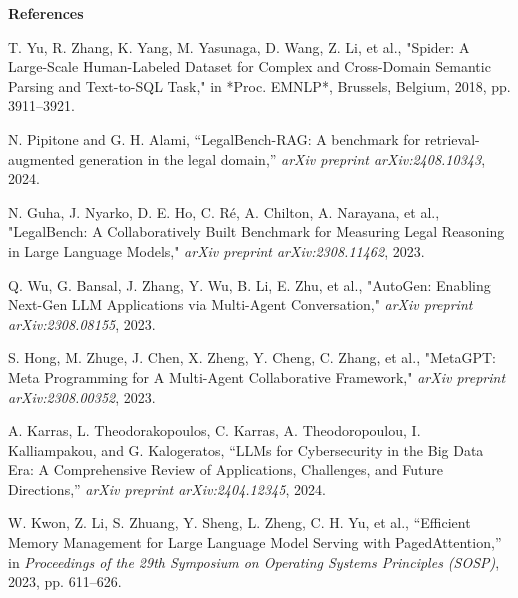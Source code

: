 \begin{center}
{\fontsize{16}{19}\selectfont\textbf{References}}
\end{center}

\vspace{3mm}

\noindent [1] T. Yu, R. Zhang, K. Yang, M. Yasunaga, D. Wang, Z. Li, et al., "Spider: A Large-Scale Human-Labeled Dataset for Complex and Cross-Domain Semantic Parsing and Text-to-SQL Task," in *Proc. EMNLP*, Brussels, Belgium, 2018, pp. 3911--3921.

\vspace{2mm}

\noindent [2] N. Pipitone and G. H. Alami, ``LegalBench-RAG: A benchmark for retrieval-augmented generation in the legal domain,'' \textit{arXiv preprint arXiv:2408.10343}, 2024.

\vspace{2mm}

\noindent [3] N. Guha, J. Nyarko, D. E. Ho, C. R\'{e}, A. Chilton, A. Narayana, et al., "LegalBench: A Collaboratively Built Benchmark for Measuring Legal Reasoning in Large Language Models," \textit{arXiv preprint arXiv:2308.11462}, 2023.

\vspace{2mm}

\noindent [4] Q. Wu, G. Bansal, J. Zhang, Y. Wu, B. Li, E. Zhu, et al., "AutoGen: Enabling Next-Gen LLM Applications via Multi-Agent Conversation," \textit{arXiv preprint arXiv:2308.08155}, 2023.

\vspace{2mm}

\noindent [5] S. Hong, M. Zhuge, J. Chen, X. Zheng, Y. Cheng, C. Zhang, et al., "MetaGPT: Meta Programming for A Multi-Agent Collaborative Framework," \textit{arXiv preprint arXiv:2308.00352}, 2023.

\vspace{2mm}

\noindent [6] A. Karras, L. Theodorakopoulos, C. Karras, A. Theodoropoulou, I. Kalliampakou, and G. Kalogeratos, ``LLMs for Cybersecurity in the Big Data Era: A Comprehensive Review of Applications, Challenges, and Future Directions,'' \textit{arXiv preprint arXiv:2404.12345}, 2024.

\vspace{2mm}

\noindent [7] W. Kwon, Z. Li, S. Zhuang, Y. Sheng, L. Zheng, C. H. Yu, et al., ``Efficient Memory Management for Large Language Model Serving with PagedAttention,'' in \textit{Proceedings of the 29th Symposium on Operating Systems Principles (SOSP)}, 2023, pp. 611--626.

